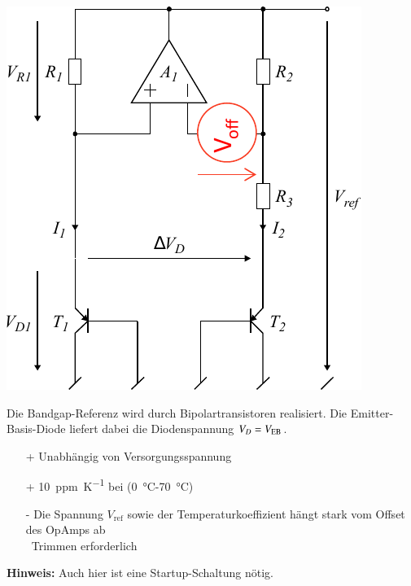 \begin{minipage}[t]{0.4\columnwidth}
    \includegraphics[width=\columnwidth, align=t]{images/13_bandgap_referenz.pdf}
\end{minipage}
\hfill
\begin{minipage}[t]{0.58\columnwidth}
    Die Bandgap-Referenz wird durch Bipolartransistoren realisiert.
    Die Emitter-Basis-Diode liefert dabei die Diodenspannung $V_D = V_{\rm EB}$.

    \smallskip

    \begin{itemize}
        \item[+] Unabhängig von Versorgungsspannung
        \item[+] \qty{10}{ppm\per\kelvin} bei (\qty{0}{\degreeCelsius}-\qty{70}{\degreeCelsius})
        \item[-] Die Spannung $V_\mathrm{ref}$ sowie der Temperaturkoeffizient hängt stark vom Offset des OpAmps ab\\
            \textrightarrow\ Trimmen erforderlich
    \end{itemize}

    \smallskip

    \textbf{Hinweis:} Auch hier ist eine Startup-Schaltung nötig.
\end{minipage}

